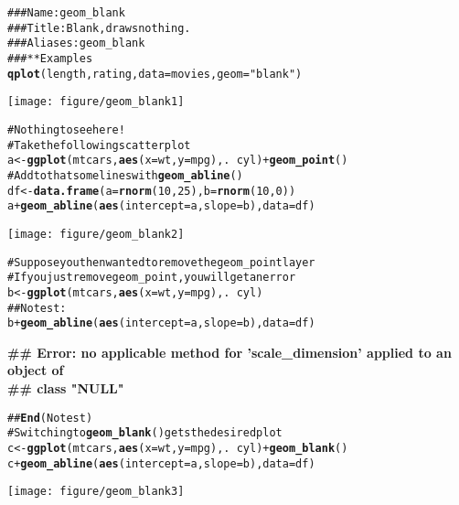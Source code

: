 \documentclass[a4paper,titlepage]{tufte-handout}\usepackage{graphicx, color}
\makeatletter
\def\maxwidth{ %
  \ifdim\Gin@nat@width>\linewidth
    \linewidth
  \else
    \Gin@nat@width
  \fi
}
\newcommand{\hlfunctioncall}[1]{\textcolor[rgb]{0.501960784313725,0,0.329411764705882}{\textbf{#1}}}%
\newcommand{\hlstring}[1]{\textcolor[rgb]{0.6,0.6,1}{#1}}%
\newcommand{\hlcomment}[1]{\textcolor[rgb]{0.180392156862745,0.6,0.341176470588235}{#1}}%
\newenvironment{kframe}{%
 \def\at@end@of@kframe{}%
 \ifinner\ifhmode%
  \def\at@end@of@kframe{\end{minipage}}%
  \begin{minipage}{\columnwidth}%
 \fi\fi%
 \def\FrameCommand##1{\hskip\@totalleftmargin \hskip-\fboxsep
 \colorbox{shadecolor}{##1}\hskip-\fboxsep
     \hskip-\linewidth \hskip-\@totalleftmargin \hskip\columnwidth}%
 \MakeFramed {\advance\hsize-\width
   \@totalleftmargin\z@ \linewidth\hsize
   \@setminipage}}%
 {\par\unskip\endMakeFramed%
 \at@end@of@kframe}
\newenvironment{knitrout}{}{} %
\makeatother
\begin{document}
\begin{knitrout}
\color{fgcolor}\begin{kframe}
\begin{alltt}
\hlcomment{### Name: geom_blank}
\hlcomment{### Title: Blank, draws nothing.}
\hlcomment{### Aliases: geom_blank}
\hlcomment{### ** Examples}
\hlfunctioncall{qplot}(length, rating, data = movies, geom = \hlstring{"blank"})
\end{alltt}
\end{kframe}\texttt{[image: figure/geom\_blank1]} \begin{kframe}\begin{alltt}
\hlcomment{# Nothing to see here!}
\hlcomment{# Take the following scatter plot}
a <- \hlfunctioncall{ggplot}(mtcars, \hlfunctioncall{aes}(x = wt, y = mpg), . ~ cyl) + \hlfunctioncall{geom_point}()
\hlcomment{# Add to that some lines with \hlfunctioncall{geom_abline}()}
df <- \hlfunctioncall{data.frame}(a = \hlfunctioncall{rnorm}(10, 25), b = \hlfunctioncall{rnorm}(10, 0))
a + \hlfunctioncall{geom_abline}(\hlfunctioncall{aes}(intercept = a, slope = b), data = df)
\end{alltt}
\end{kframe}\texttt{[image: figure/geom\_blank2]} \begin{kframe}\begin{alltt}
\hlcomment{# Suppose you then wanted to remove the geom_point layer}
\hlcomment{# If you just remove geom_point, you will get an error}
b <- \hlfunctioncall{ggplot}(mtcars, \hlfunctioncall{aes}(x = wt, y = mpg), . ~ cyl)
\hlcomment{## No test: }
b + \hlfunctioncall{geom_abline}(\hlfunctioncall{aes}(intercept = a, slope = b), data = df)
\end{alltt}
\begin{flushleft}\ttfamily\noindent\bfseries\textcolor{errorcolor}{\#\# Error: no applicable method for 'scale\_dimension' applied to an object of \\ 
\#\# class "NULL"}\end{flushleft}\begin{alltt}
\hlcomment{## \hlfunctioncall{End}(No test)}
\hlcomment{# Switching to \hlfunctioncall{geom_blank}() gets the desired plot}
c <- \hlfunctioncall{ggplot}(mtcars, \hlfunctioncall{aes}(x = wt, y = mpg), . ~ cyl) + \hlfunctioncall{geom_blank}()
c + \hlfunctioncall{geom_abline}(\hlfunctioncall{aes}(intercept = a, slope = b), data = df)
\end{alltt}
\end{kframe}\texttt{[image: figure/geom\_blank3]} 
\end{knitrout}
\end{document}
